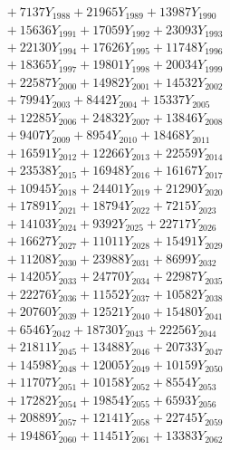 \documentclass[a4paper,10pt]{article}
\begin{document}
{\begin{align}
&\;  + 7137 Y_{1988} + 21965 Y_{1989} + 13987 Y_{1990} \\[0.3ex]
&\;  + 15636 Y_{1991} + 17059 Y_{1992} + 23093 Y_{1993} \\[0.3ex]
&\;  + 22130 Y_{1994} + 17626 Y_{1995} + 11748 Y_{1996} \\[0.3ex]
&\;  + 18365 Y_{1997} + 19801 Y_{1998} + 20034 Y_{1999} \\[0.3ex]
&\;  + 22587 Y_{2000} + 14982 Y_{2001} + 14532 Y_{2002} \\[0.3ex]
&\;  + 7994 Y_{2003} + 8442 Y_{2004} + 15337 Y_{2005} \\[0.3ex]
&\;  + 12285 Y_{2006} + 24832 Y_{2007} + 13846 Y_{2008} \\[0.5ex]\allowbreak
&\;  + 9407 Y_{2009} + 8954 Y_{2010} + 18468 Y_{2011} \\[0.3ex]
&\;  + 16591 Y_{2012} + 12266 Y_{2013} + 22559 Y_{2014} \\[0.3ex]
&\;  + 23538 Y_{2015} + 16948 Y_{2016} + 16167 Y_{2017} \\[0.3ex]
&\;  + 10945 Y_{2018} + 24401 Y_{2019} + 21290 Y_{2020} \\[0.3ex]
&\;  + 17891 Y_{2021} + 18794 Y_{2022} + 7215 Y_{2023} \\[0.3ex]
&\;  + 14103 Y_{2024} + 9392 Y_{2025} + 22717 Y_{2026} \\[0.3ex]
&\;  + 16627 Y_{2027} + 11011 Y_{2028} + 15491 Y_{2029} \\[0.3ex]
&\;  + 11208 Y_{2030} + 23988 Y_{2031} + 8699 Y_{2032} \\[0.3ex]
&\;  + 14205 Y_{2033} + 24770 Y_{2034} + 22987 Y_{2035} \\[0.3ex]
&\;  + 22276 Y_{2036} + 11552 Y_{2037} + 10582 Y_{2038} \\[0.5ex]\allowbreak
&\;  + 20760 Y_{2039} + 12521 Y_{2040} + 15480 Y_{2041} \\[0.3ex]
&\;  + 6546 Y_{2042} + 18730 Y_{2043} + 22256 Y_{2044} \\[0.3ex]
&\;  + 21811 Y_{2045} + 13488 Y_{2046} + 20733 Y_{2047} \\[0.3ex]
&\;  + 14598 Y_{2048} + 12005 Y_{2049} + 10159 Y_{2050} \\[0.3ex]
&\;  + 11707 Y_{2051} + 10158 Y_{2052} + 8554 Y_{2053} \\[0.3ex]
&\;  + 17282 Y_{2054} + 19854 Y_{2055} + 6593 Y_{2056} \\[0.3ex]
&\;  + 20889 Y_{2057} + 12141 Y_{2058} + 22745 Y_{2059} \\[0.3ex]
&\;  + 19486 Y_{2060} + 11451 Y_{2061} + 13383 Y_{2062} \\[0.3ex]

\end{align}}
\end{document}
